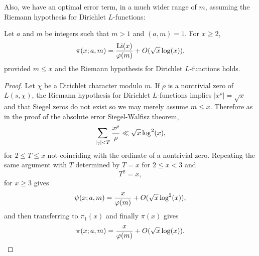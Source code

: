    Also, we have an optimal error term, in a much wider range of $m$, assuming the Riemann hypothesis for Dirichlet $L$-functions:
    
    \begin{proposition}
      Let $a$ and $m$ be integers such that $m > 1$ and $(a,m) = 1$. For $x \ge 2$,
      \[
        \pi(x;a,m) = \frac{\operatorname{\mathrm{Li}}(x)}{\varphi(m)}+O(\sqrt{x}\log(x)),
      \]
      provided $m \le x$ and the Riemann hypothesis for Dirichlet $L$-functions holds.
    \end{proposition}
    \begin{proof}
      Let $\chi$ be a Dirichlet character modulo $m$. If $\rho$ is a nontrivial zero of $L(s,\chi)$, the Riemann hypothesis for Dirichlet $L$-functions implies $|x^{\rho}| = \sqrt{x}$ and that Siegel zeros do not exist so we may merely assume $m \le x$. Therefore as in the proof of the absolute error Siegel-Walfisz theorem,
      \[
        \sum_{|\gamma| < T}\frac{x^{\rho}}{\rho} \ll \sqrt{x}\log^{2}(x),
      \]
      for $2 \le T \le x$ not coinciding with the ordinate of a nontrivial zero. Repeating the same argument with $T$ determined by $T = x$ for $2 \le x < 3$ and 
      \[
        T^{2} = x,
      \]
      for $x \ge 3$ gives
      \[
        \psi(x;a,m) = \frac{x}{\varphi(m)}+O(\sqrt{x}\log^{2}(x)),
      \]
      and then transferring to $\pi_{1}(x)$ and finally $\pi(x)$ gives
      \[
        \pi(x;a,m) = \frac{x}{\varphi(m)}+O(\sqrt{x}\log(x)).
      \]
      \end{proof}